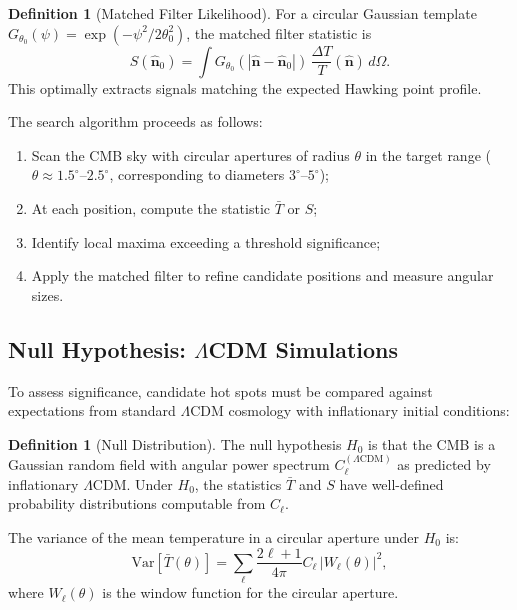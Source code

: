 \documentclass[11pt,a4paper]{article}
\theoremstyle{plain}
\theoremstyle{definition}
\newtheorem{definition}[theorem]{Definition}
\theoremstyle{remark}
\begin{document}
\begin{definition}[Matched Filter Likelihood]\label{def:matched_filter}
For a circular Gaussian template $G_{\theta_0}(\psi) = \exp(-\psi^2/2\theta_0^2)$, the matched filter statistic is
\begin{equation}\label{eq:matched_filter}
    S(\hat{\bm{n}}_0) = \int G_{\theta_0}(|\hat{\bm{n}} - \hat{\bm{n}}_0|) \, \frac{\Delta T}{T}(\hat{\bm{n}}) \, d\Omega.
\end{equation}
This optimally extracts signals matching the expected Hawking point profile.
\end{definition}

The search algorithm proceeds as follows:
\begin{enumerate}
    \item Scan the CMB sky with circular apertures of radius $\theta$ in the target range ($\theta \approx 1.5^\circ$--$2.5^\circ$, corresponding to diameters $3^\circ$--$5^\circ$);
    \item At each position, compute the statistic $\bar{T}$ or $S$;
    \item Identify local maxima exceeding a threshold significance;
    \item Apply the matched filter to refine candidate positions and measure angular sizes.
\end{enumerate}

\subsection{Null Hypothesis: \texorpdfstring{$\Lambda$CDM}{LCDM} Simulations}

To assess significance, candidate hot spots must be compared against expectations from standard $\Lambda$CDM cosmology with inflationary initial conditions:

\begin{definition}[Null Distribution]\label{def:null_dist}
The null hypothesis $H_0$ is that the CMB is a Gaussian random field with angular power spectrum $C_\ell^{(\Lambda\text{CDM})}$ as predicted by inflationary $\Lambda$CDM. Under $H_0$, the statistics $\bar{T}$ and $S$ have well-defined probability distributions computable from $C_\ell$.
\end{definition}

The variance of the mean temperature in a circular aperture under $H_0$ is:
\begin{equation}\label{eq:variance_circular}
    \text{Var}[\bar{T}(\theta)] = \sum_\ell \frac{2\ell + 1}{4\pi} C_\ell \, |W_\ell(\theta)|^2,
\end{equation}
where $W_\ell(\theta)$ is the window function for the circular aperture.
\end{document}
